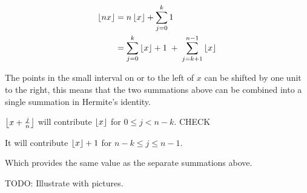 \documentclass[11pt]{amsart}
\begin{document}
$$
\begin{aligned}
 \left\lfloor {nx} \right\rfloor  &= 
n  \left\lfloor {x} \right\rfloor  + \sum_{j=0}^{k} 1 
\\
&=
\sum_{j=0}^{k}  \left\lfloor {x} \right\rfloor  + 1 \; + \; 
\sum_{j=k+1}^{n-1}  \left\lfloor {x} \right\rfloor 
\end{aligned}
$$

The points in the small interval on or to the left of $x$ can be shifted by one unit to the right, this means that the two summations above can be combined into a single summation in Hermite's identity.

$ \left\lfloor {x + \frac{j}{n}} \right\rfloor $ will contribute 
$ \left\lfloor {x} \right\rfloor $ for 
$0 \le j < n-k$. CHECK

It will contribute $ \left\lfloor {x} \right\rfloor  + 1$ for 
$n-k \le j \le n-1$. 

Which provides the same value as the separate summations above.

TODO: Illustrate with pictures.
\end{document}
